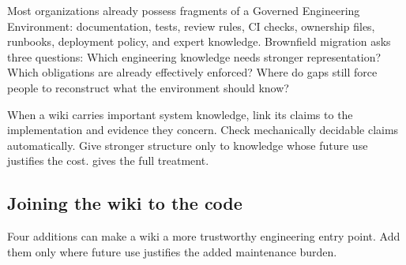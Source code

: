 
Most organizations already possess fragments of a Governed Engineering Environment: documentation, tests, review rules, CI checks, ownership files, runbooks, deployment policy, and expert knowledge. Brownfield migration asks three questions: Which engineering knowledge needs stronger representation? Which obligations are already effectively enforced? Where do gaps still force people to reconstruct what the environment should know?

When a wiki carries important system knowledge, link its claims to the implementation and evidence they concern. Check mechanically decidable claims automatically. Give stronger structure only to knowledge whose future use justifies the cost. \href{4.3-brownfield-engineering.html}{} gives the full treatment.

\subsection{Joining the wiki to the code}\label{heading:joining-the-wiki-to-the-code}

Four additions can make a wiki a more trustworthy engineering entry point. Add them only where future use justifies the added maintenance burden.

